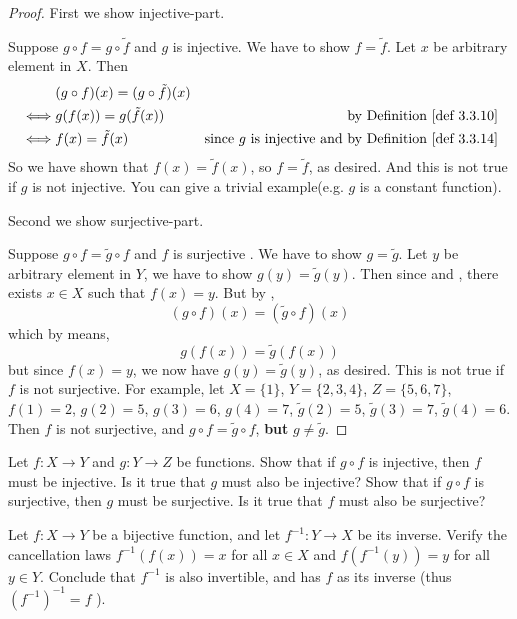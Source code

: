 \begin{proof}
First we show injective-part.

Suppose \(g \circ f = g \circ \tilde{f}\) and \(g\) is injective. We have to show \(f = \tilde{f}\). Let \(x\) be arbitrary element in \(X\). Then
\begin{align*}
         & (g \circ f)(x) = (g \circ \tilde{f})(x) \\
    \iff & g(f(x)) = g(\tilde{f}(x)) & \text{by \DEF{3.3.10}} \\
    \iff & f(x) = \tilde{f}(x)       & \text {since \(g\) is injective and by \DEF{3.3.14}}
\end{align*}
So we have shown that \(f(x) = \tilde{f}(x)\), so \(f = \tilde{f}\), as desired. And this is not true if \(g\) is not injective. You can give a trivial example(e.g. \(g\) is a constant function).

Second we show surjective-part.

Suppose \(g \circ f = \tilde{g} \circ f\)  and \(f\) is surjective . We have to show \(g = \tilde{g}\). Let \(y\) be arbitrary element in \(Y\), we have to show \(g(y) = \tilde{g}(y)\). Then since  and , there exists \(x \in X\) such that \(f(x) = y\). But by ,
\[
    (g \circ f)(x) = (\tilde{g} \circ f)(x)
\]
which by  means,
\[
    g(f(x)) = \tilde{g}(f(x))
\]
but since \(f(x) = y\), we now have \(g(y) = \tilde{g}(y)\), as desired. This is not true if \(f\) is not surjective. For example, let \(X = \{1\}\), \(Y = \{2, 3, 4\}\), \(Z = \{5, 6, 7\}\), \(f(1) = 2\), \(g(2) = 5\), \(g(3) = 6\), \(g(4) = 7\), \(\tilde{g}(2) = 5\), \(\tilde{g}(3) = 7\), \(\tilde{g}(4) = 6\). Then \(f\) is not surjective, and \(g \circ f = \tilde{g} \circ f\), \textbf{but} \(g \neq \tilde{g}\).
\end{proof}

\begin{exercise} \label{exercise 3.3.5}
Let \(f : X \rightarrow Y\) and \(g : Y \rightarrow Z\) be functions. Show that if \(g \circ f\) is injective, then \(f\) must be injective. Is it true that \(g\) must also be injective? Show that if \(g \circ f\) is surjective, then \(g\) must be surjective. Is it true that \(f\) must also be surjective?
\end{exercise}

\begin{exercise} \label{exercise 3.3.6}
Let \(f : X \rightarrow Y\) be a bijective function, and let \(f^{-1} : Y \rightarrow X\) be its inverse. Verify the cancellation laws \(f^{-1}(f(x)) = x\) for all \(x \in X\) and \(f(f^{-1}(y)) = y\) for all \(y \in Y\). Conclude that \(f^{-1}\) is also invertible, and has \(f\) as its inverse (thus \( (f^{-1})^{-1} = f \) ).
\end{exercise}

